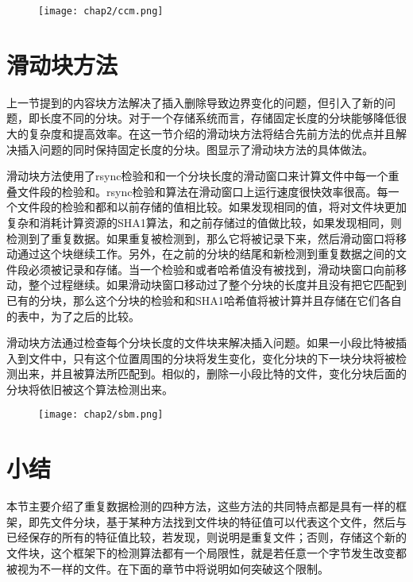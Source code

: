 \begin{figure}[!hbp]
    \begin{minipage}[b]{1\textwidth}
    \captionstyle{\centering}
    \centering
    \texttt{[image: chap2/ccm.png]}
    \end{minipage}
\end{figure}

\section{滑动块方法}
\label{sec:slidingblock}

上一节提到的内容块方法解决了插入删除导致边界变化的问题，但引入了新的问题，即长度不同的分块。对于一个存储系统而言，存储固定长度的分块能够降低很大的复杂度和提高效率。在这一节介绍的滑动块方法将结合先前方法的优点并且解决插入问题的同时保持固定长度的分块。图显示了滑动块方法的具体做法。

滑动块方法使用了rsync检验和和一个分块长度的滑动窗口来计算文件中每一个重叠文件段的检验和。rsync检验和算法在滑动窗口上运行速度很快效率很高。每一个文件段的检验和都和以前存储的值相比较。如果发现相同的值，将对文件块更加复杂和消耗计算资源的SHA1算法，和之前存储过的值做比较，如果发现相同，则检测到了重复数据。如果重复被检测到，那么它将被记录下来，然后滑动窗口将移动通过这个块继续工作。另外，在之前的分块的结尾和新检测到重复数据之间的文件段必须被记录和存储。当一个检验和或者哈希值没有被找到，滑动块窗口向前移动，整个过程继续。如果滑动块窗口移动过了整个分块的长度并且没有把它匹配到已有的分块，那么这个分块的检验和和SHA1哈希值将被计算并且存储在它们各自的表中，为了之后的比较。

滑动块方法通过检查每个分块长度的文件块来解决插入问题。如果一小段比特被插入到文件中，只有这个位置周围的分块将发生变化，变化分块的下一块分块将被检测出来，并且被算法所匹配到。相似的，删除一小段比特的文件，变化分块后面的分块将依旧被这个算法检测出来。

\begin{figure}[!hbp]
    \begin{minipage}[b]{1\textwidth}
    \captionstyle{\centering}
    \centering
    \texttt{[image: chap2/sbm.png]}
    \end{minipage}
\end{figure}

\section{小结}
\label{sec:relatedwork}
本节主要介绍了重复数据检测的四种方法，这些方法的共同特点都是具有一样的框架，即先文件分块，基于某种方法找到文件块的特征值可以代表这个文件，然后与已经保存的所有的特征值比较，若发现，则说明是重复文件；否则，存储这个新的文件块，这个框架下的检测算法都有一个局限性，就是若任意一个字节发生改变都被视为不一样的文件。在下面的章节中将说明如何突破这个限制。
